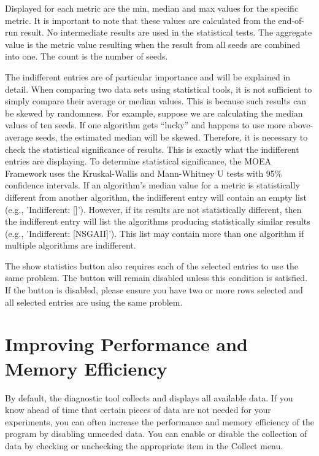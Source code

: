 Displayed for each metric are the min, median and max values for the specific metric.  It is important to note that these values are calculated from the end-of-run result.  No intermediate results are used in the statistical tests.  The aggregate value is the metric value resulting when the result from all seeds are combined into one.  The count is the number of seeds.  

The indifferent entries are of particular importance and will be explained in detail.  When comparing two data sets using statistical tools, it is not sufficient to simply compare their average or median values.  This is because such results can be skewed by randomness.  For example, suppose we are calculating the median values of ten seeds.  If one algorithm gets ``lucky'' and happens to use more above-average seeds, the estimated median will be skewed.  Therefore, it is necessary to check the statistical significance of results.  This is exactly what the indifferent entries are displaying.  To determine statistical significance, the MOEA Framework uses the Kruskal-Wallis and Mann-Whitney U tests with 95\% confidence intervals.  If an algorithm's median value for a metric is statistically different from another algorithm, the indifferent entry will contain an empty list (e.g., 'Indifferent: []').  However, if its results are not statistically different, then the indifferent entry will list the algorithms producing statistically similar results (e.g., 'Indifferent: [NSGAII]').  This list may contain more than one algorithm if multiple algorithms are indifferent.

\begin{important}
  The show statistics button also requires each of the selected entries to use the same problem.  The button will remain disabled unless this condition is satisfied.  If the button is disabled, please ensure you have two or more rows selected and all selected entries are using the same problem.
\end{important}

\section{Improving Performance and Memory Efficiency}
By default, the diagnostic tool collects and displays all available data.  If you know ahead of time that certain pieces of data are not needed for your experiments, you can often increase the performance and memory efficiency of the program by disabling unneeded data.  You can enable or disable the collection of data by checking or unchecking the appropriate item in the Collect menu.

